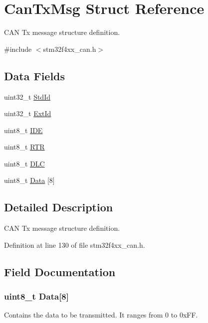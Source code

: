 \hypertarget{struct_can_tx_msg}{\section{Can\-Tx\-Msg Struct Reference}
\label{struct_can_tx_msg}
}


C\-A\-N Tx message structure definition.  




{\ttfamily \#include $<$stm32f4xx\-\_\-can.\-h$>$}

\subsection*{Data Fields}
\begin{DoxyCompactItemize}
\item 
uint32\-\_\-t \hyperlink{struct_can_tx_msg_a511131786af8d1534273e48ea2052245}{Std\-Id}
\item 
uint32\-\_\-t \hyperlink{struct_can_tx_msg_a8625d2aaf6b0b99f0faf0b8cd07debd4}{Ext\-Id}
\item 
uint8\-\_\-t \hyperlink{struct_can_tx_msg_accecf260a60cf687f0f9898421aeea86}{I\-D\-E}
\item 
uint8\-\_\-t \hyperlink{struct_can_tx_msg_a131e825d532b66f27dbb74aa80864d37}{R\-T\-R}
\item 
uint8\-\_\-t \hyperlink{struct_can_tx_msg_a5f86974a53a85fb5706e08f8106296b9}{D\-L\-C}
\item 
uint8\-\_\-t \hyperlink{struct_can_tx_msg_ab7783127a49388ba2431603e29251b9b}{Data} \mbox{[}8\mbox{]}
\end{DoxyCompactItemize}


\subsection{Detailed Description}
C\-A\-N Tx message structure definition. 

Definition at line 130 of file stm32f4xx\-\_\-can.\-h.



\subsection{Field Documentation}
\hypertarget{struct_can_tx_msg_ab7783127a49388ba2431603e29251b9b}{
\subsubsection[{Data}]{\setlength{\rightskip}{0pt plus 5cm}uint8\-\_\-t Data\mbox{[}8\mbox{]}}}\label{struct_can_tx_msg_ab7783127a49388ba2431603e29251b9b}
Contains the data to be transmitted. It ranges from 0 to 0x\-F\-F. 

